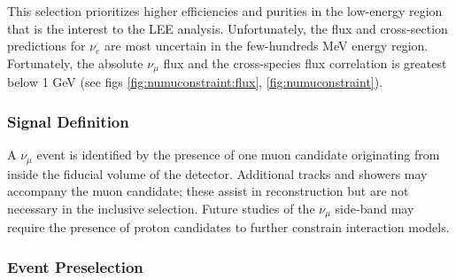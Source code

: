 \par This selection prioritizes higher efficiencies and purities in the low-energy region that is the interest to the LEE analysis. Unfortunately, the flux and cross-section predictions for $\nu_{e}$ are most uncertain in the few-hundreds MeV energy region. Fortunately, the absolute $\nu_{\mu}$ flux and the cross-species flux correlation is greatest below 1 GeV (see figs \ref{fig:numuconstraint:flux}, \ref{fig:numuconstraint}).

\subsubsection{Signal Definition}
\label{sssec:NuMUCCsel:constr:signaldef}
\par A $\nu_{\mu}$ event is identified by the presence of one muon candidate originating from inside the fiducial volume of the detector. Additional tracks and showers may accompany the muon candidate; these assist in reconstruction but are not necessary in the inclusive selection. Future studies of the $\nu_{\mu}$ side-band may require the presence of proton candidates to further constrain interaction models.

\subsubsection{Event Preselection}
\label{sssec:NuMUCCsel:constr:preselec}

